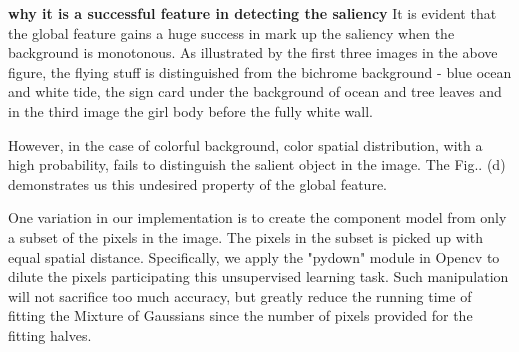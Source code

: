 \documentclass[10pt,twocolumn,letterpaper]{article}
\newcommand{\BOLD}{\textbf}
\begin{document}
\BOLD{why it is a successful feature in detecting the saliency}
It is evident that the global feature gains a huge success in mark up the saliency when the background is monotonous. As illustrated by the first three images in the above figure, the flying stuff is distinguished from the bichrome background - blue ocean and white tide, the sign card under the  background of ocean and tree leaves and in the third image the girl body before the fully white wall.

However, in the case of colorful background, color spatial distribution, with a high probability, fails to distinguish the salient object in the image. The Fig.. (d) demonstrates us this undesired property of the global feature. 

One variation in our implementation is to create the component model from only a subset of the pixels in the image. The pixels in the subset is picked up with equal spatial distance. Specifically, we apply the "pydown" module in Opencv to dilute the pixels participating this unsupervised learning task. Such manipulation will not sacrifice too much accuracy, but greatly reduce  the running time of fitting the Mixture of Gaussians since the number of pixels provided for the fitting halves. 
\end{document}
